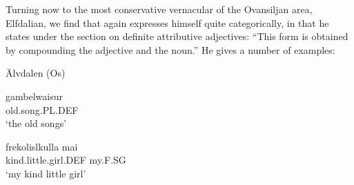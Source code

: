 
Turning now to the most conservative vernacular of the Ovansiljan area, Elfdalian, we find that \citet[53]{Levander1909} again expresses himself quite categorically, in that he states under the section on definite attributive adjectives: “This form is obtained by compounding the adjective and the noun.” He gives a number of examples:


\item 

\label{bkm:Ref150329355}Älvdalen (Os)



\item 


 \ea\label{}
\gll gambelwaisur\\


old.song.PL.DEF\\

\glt ‘the old songs’

\z

\item 


 \ea\label{}
\gll frekolislkulla  mai\\


kind.little.girl.DEF  my.F.SG\\

\glt ‘my kind little girl’

\z

\item 


